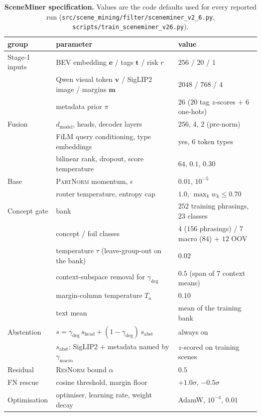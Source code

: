 \documentclass[10pt,letterpaper]{article}
\begin{document}
\begin{table}[h]\centering\small
\caption{\textbf{SceneMiner specification.} Values are the code defaults used
for every reported run (\texttt{src/scene\_mining/filter/sceneminer\_v2\_6.py},
\texttt{scripts/train\_sceneminer\_v26.py}).}
\label{tab:hp}
\begin{tabular}{lll}
\toprule
group & parameter & value\\
\midrule
Stage-1 inputs & BEV embedding $\mathbf{e}$ / tags $\mathbf{t}$ / risk $r$ & $256$ / $20$ / $1$\\
 & Qwen visual token $\mathbf{v}$ / SigLIP2 image / margins $\mathbf{m}$ & $2048$ / $768$ / $4$\\
 & metadata prior $\pi$ & $26$ ($20$ tag $z$-scores $+$ $6$ one-hots)\\
Fusion & $d_{\mathrm{model}}$, heads, decoder layers & $256$, $4$, $2$ (pre-norm)\\
 & FiLM query conditioning, type embeddings & yes, $6$ token types\\
 & bilinear rank, dropout, score temperature & $64$, $0.1$, $0.30$\\
Base & \textsc{PartNorm} momentum, $\epsilon$ & $0.01$, $10^{-5}$\\
 & router temperature, entropy cap & $1.0$, $\max_k w_k\le0.70$\\
Concept gate & bank & $252$ training phrasings, $23$ classes\\
 & concept / foil classes & $4$ ($156$ phrasings) / $7$ macro ($84$) $+$ $12$ OOV\\
 & temperature $\tau$ (leave-group-out on the bank) & $0.02$\\
 & context-subspace removal for $\gamma_{\mathrm{deg}}$ & $0.5$ (span of $7$ context means)\\
 & margin-column temperature $T_a$ & $0.10$\\
 & text mean & mean of the training bank\\
Abstention & $s=\gamma_{\mathrm{deg}}\,s_{\mathrm{head}}+(1-\gamma_{\mathrm{deg}})\,s_{\mathrm{abst}}$ & always on\\
 & $s_{\mathrm{abst}}$: SigLIP2 $+$ metadata named by $\gamma_{\mathrm{macro}}$ & $z$-scored on training scenes\\
Residual & \textsc{ResNorm} bound $\alpha$ & $0.5$\\
FN rescue & cosine threshold, margin floor & $+1.0\sigma$, $-0.5\sigma$\\
Optimisation & optimiser, learning rate, weight decay & AdamW, $10^{-4}$, $0.01$\\

\end{tabular}
\end{table}
\end{document}
